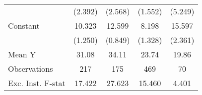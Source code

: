 {\begin{tabular}{l*{4}{c}}
                    &     (2.392)         &     (2.568)         &     (1.552)         &     (5.249)         \\
\addlinespace
Constant            &      10.323\sym{***}&      12.599\sym{***}&       8.198\sym{***}&      15.597\sym{***}\\
                    &     (1.250)         &     (0.849)         &     (1.328)         &     (2.361)         \\
\midrule
Mean Y              &       31.08         &       34.11         &       23.74         &       19.86         \\
Observations        &         217         &         175         &         469         &          70         \\
Exc. Inst. F-stat   &      17.422         &      27.623         &      15.460         &       4.401         \\
\bottomrule
\end{tabular}
}
